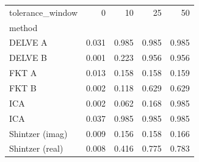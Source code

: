 \begin{tabular}{lrrrr}
\toprule
tolerance_window & 0 & 10 & 25 & 50 \\
method &  &  &  &  \\
\midrule
DELVE A & 0.031 & 0.985 & 0.985 & 0.985 \\
DELVE B & 0.001 & 0.223 & 0.956 & 0.956 \\
FKT A & 0.013 & 0.158 & 0.158 & 0.159 \\
FKT B & 0.002 & 0.118 & 0.629 & 0.629 \\
ICA #1 & 0.002 & 0.062 & 0.168 & 0.985 \\
ICA #2 & 0.037 & 0.985 & 0.985 & 0.985 \\
Shintzer (imag) & 0.009 & 0.156 & 0.158 & 0.166 \\
Shintzer (real) & 0.008 & 0.416 & 0.775 & 0.783 \\
\bottomrule
\end{tabular}

